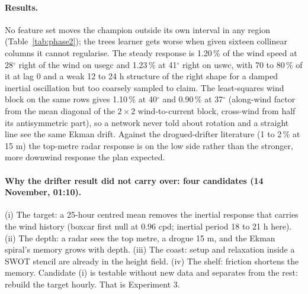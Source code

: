 \documentclass[11pt]{article}
\newcommand{\R}{R^2}
\begin{document}
\paragraph{Results.} No feature set moves the champion outside its own interval in any region (Table~\ref{tab:phase2}); the trees learner gets worse when given sixteen collinear columns it cannot regularise. The steady response is 1.20\,\% of the wind speed at 28$^\circ$ right of the wind on usegc and 1.23\,\% at 41$^\circ$ right on uswc, with 70 to 80\,\% of it at lag 0 and a weak 12 to 24 h structure of the right shape for a damped inertial oscillation but too coarsely sampled to claim. The least-squares wind block on the same rows gives 1.10\,\% at 40$^\circ$ and 0.90\,\% at 37$^\circ$ (along-wind factor from the mean diagonal of the $2\times2$ wind-to-current block, cross-wind from half its antisymmetric part), so a network never told about rotation and a straight line see the same Ekman drift. Against the drogued-drifter literature (1 to 2\,\% at 15 m) the top-metre radar response is on the low side rather than the stronger, more downwind response the plan expected.

\begin{table}[h]\centering\small
\caption{Phase 2 ladder on the 25-hour target, $\R$ $u$ / $v$, cycles 017--058, US year-one training. Intervals for the two models that matter in brackets.}
\label{tab:phase2}
\end{table}

\paragraph{Why the drifter result did not carry over: four candidates (14 November, 01:10).} (i) The target: a 25-hour centred mean removes the inertial response that carries the wind history (boxcar first null at 0.96 cpd; inertial period 18 to 21 h here). (ii) The depth: a radar sees the top metre, a drogue 15 m, and the Ekman spiral's memory grows with depth. (iii) The coast: setup and relaxation inside a SWOT stencil are already in the height field. (iv) The shelf: friction shortens the memory. Candidate (i) is testable without new data and separates from the rest: rebuild the target hourly. That is Experiment 3.
\end{document}
